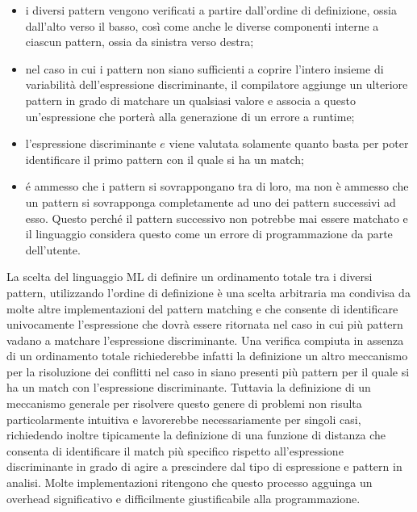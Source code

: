 \begin{itemize}

\item i diversi pattern vengono verificati a partire dall’ordine di definizione,
ossia dall’alto verso il basso, così come anche le diverse componenti interne a
ciascun pattern, ossia da sinistra verso destra;

\item nel caso in cui i pattern non siano sufficienti a coprire l’intero insieme
di variabilità dell’espressione discriminante, il compilatore aggiunge un
ulteriore pattern in grado di matchare un qualsiasi valore e associa a questo
un’espressione che porterà alla generazione di un errore a runtime;

\item l’espressione discriminante $e$ viene valutata solamente quanto basta per
poter identificare il primo pattern con il quale si ha un match;

\item é ammesso che i pattern si sovrappongano tra di loro, ma non è ammesso che
un pattern si sovrapponga completamente ad uno dei pattern successivi ad esso.
Questo perché il pattern successivo non potrebbe mai essere matchato e il
linguaggio considera questo come un errore di programmazione da parte
dell'utente.

\end{itemize}

La scelta del linguaggio ML di definire un ordinamento totale tra i diversi
pattern, utilizzando l’ordine di definizione è una scelta arbitraria ma
condivisa da molte altre implementazioni del pattern matching e che consente di
identificare univocamente l'espressione che dovrà essere ritornata nel caso in
cui più pattern vadano a matchare l'espressione discriminante. Una verifica
compiuta in assenza di un ordinamento totale richiederebbe infatti la
definizione un altro meccanismo per la risoluzione dei conflitti nel caso in
siano presenti più pattern per il quale si ha un match con l’espressione
discriminante. Tuttavia la definizione di un meccanismo generale per risolvere
questo genere di problemi non risulta particolarmente intuitiva e lavorerebbe
necessariamente per singoli casi, richiedendo inoltre tipicamente la definizione
di una funzione di distanza che consenta di identificare il match più specifico
rispetto all’espressione discriminante in grado di agire a prescindere dal tipo
di espressione e pattern in analisi. Molte implementazioni ritengono che questo
processo agguinga un overhead significativo e difficilmente giustificabile alla
programmazione.\\

